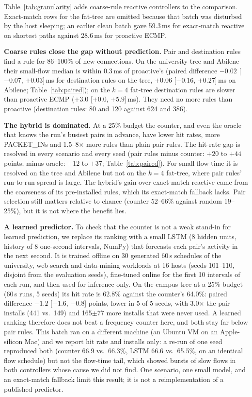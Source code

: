 \documentclass[sigconf]{acmart}
\begin{document}
Table~\ref{tab:granularity} adds coarse-rule reactive controllers to the comparison. Exact-match rows for the fat-tree are omitted because that batch was disturbed by the host sleeping; an earlier clean batch gave 59.3\,ms for exact-match reactive on shortest paths against 28.6\,ms for proactive ECMP.

\textbf{Coarse rules close the gap without prediction.} Pair and destination rules find a rule for 86--100\% of new connections. On the university tree and Abilene their small-flow median is within 0.3\,ms of proactive's (paired difference $-0.02$ [$-0.07$, $+0.03$]\,ms for destination rules on the tree, $+0.06$ [$-0.16$, $+0.27$]\,ms on Abilene; Table~\ref{tab:paired}); on the $k{=}4$ fat-tree destination rules are slower than proactive ECMP ($+3.0$ [$+0.0$, $+5.9$]\,ms). They need no more rules than proactive (destination rules: 80 and 120 against 624 and 386).

\textbf{The hybrid is dominated.} At a 25\% budget the counter, and even the oracle that knows the run's busiest pairs in advance, have lower hit rates, more PACKET\_INs and 1.5--8$\times$ more rules than plain pair rules. The hit-rate gap is resolved in every scenario and every seed (pair rules minus counter: $+20$ to $+44$ points; minus oracle: $+12$ to $+37$; Table~\ref{tab:paired}). For small-flow time it is resolved on the tree and Abilene but not on the $k{=}4$ fat-tree, where pair rules' run-to-run spread is large. The hybrid's gain over exact-match reactive came from the coarseness of its pre-installed rules, which its exact-match fallback lacks. Pair selection still matters relative to chance (counter 52--66\% against random 19--25\%), but it is not where the benefit lies.

\textbf{A learned predictor.} To check that the counter is not a weak stand-in for learned prediction, we replace its ranking with a small LSTM (8 hidden units, history of 8 one-second intervals, NumPy) that forecasts each pair's activity in the next second. It is trained offline on 30 generated 60\,s schedules of the university, web-search and data-mining workloads at 16 hosts (seeds 101--110, disjoint from the evaluation seeds), fine-tuned online for the first 10 intervals of each run, and then used for inference only. On the campus tree at a 25\% budget (60\,s runs, 5 seeds) its hit rate is 62.8\% against the counter's 64.0\%: paired difference $-1.2$ [$-1.6$, $-0.8$] points, lower in 5 of 5 seeds, with 3.0$\times$ the pair installs (441 vs.\ 149) and 165$\pm$77 more installs that were never used. A learned ranking therefore does not beat a frequency counter here, and both stay far below pair rules. This batch ran on a different machine (an Ubuntu VM on an Apple-silicon Mac) and we report hit rate and installs only: a re-run of one seed reproduced both (counter 66.9 vs.\ 66.3\%, LSTM 66.6 vs.\ 65.5\%, on an identical flow schedule) but not the flow-time tail, which showed bursts of slow flows in both controllers whose cause we did not find. One scenario, one small model, and an exact-match fallback limit this result; it is not a reimplementation of a published predictor.
\end{document}
